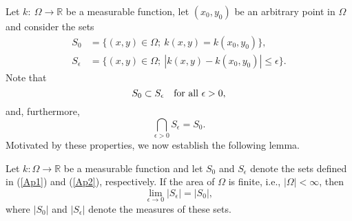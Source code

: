 \documentclass{imanum}
\begin{document}
Let $k:\ \Omega \rightarrow \mathbb{R}$ be a measurable function,
let $(x_0,y_0)$ be an arbitrary point in $\Omega$ and consider
the sets
\begin{align}
S_0 & = \{ (x,y) \in \Omega;\ k(x,y) = k(x_0,y_0) \},
\label{Ap1}
\\[4pt]
S_\epsilon & = \{ (x,y) \in \Omega;\ |k(x,y) - k(x_0,y_0)|
\leq \epsilon \}.
\label{Ap2}
\end{align}
Note that
\begin{equation}
S_0 \subset S_\epsilon \quad \hbox{for all}\ \epsilon > 0,
\label{Ap3}
\end{equation}
and, furthermore,
\begin{equation*}
\bigcap_{\epsilon > 0} S_{\epsilon} = S_0.
\end{equation*}
Motivated by these properties, we now establish the following lemma.

\begin{lemma}
\label{lemma1}
Let $k:\Omega \rightarrow \mathbb{R}$ be a measurable function and
let $S_0$ and $S_\epsilon$ denote the sets defined in (\ref{Ap1})
and (\ref{Ap2}), respectively. If the area of $\Omega$ is finite,
i.e., $|\Omega| < \infty$, then
\begin{equation*}
\lim_{\epsilon \rightarrow 0} |S_\epsilon| = |S_0|,
\end{equation*}
where $|S_0|$ and $|S_\epsilon|$ denote the measures of these sets.
\end{lemma}
\end{document}
